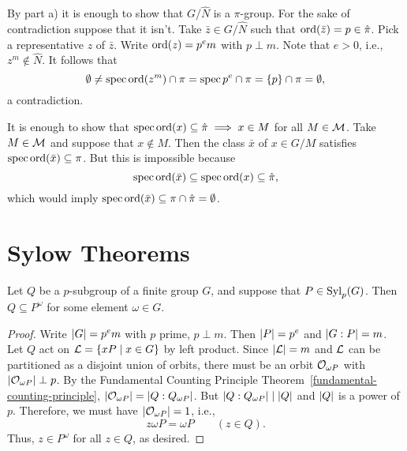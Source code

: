 \begin{solution}
\begin{enumerate}[\rm a)]
    \begin{description}[leftmargin=!,labelwidth=\widthof{$\hat N$:}]
    \item[$\hat N\supseteq N$:]
        By part a) it is enough to show that $G/\hat N$ is a $\pi$-group. For the sake of contradiction suppose that it isn't. Take $\bar z\in G/\hat N$ such that ${\rm ord}(\bar z)=p\in\hat\pi$. Pick a representative $z$ of $\bar z$. Write ${\rm ord}(z)=p^em$ with $p\perp m$. Note that $e>0$, i.e., $z^m\notin\hat N$. It follows that
        $$
            \emptyset\ne\operatorname{spec}{\rm ord}(z^m)\cap\pi=\operatorname{spec}p^e\cap\pi
                =\{p\}\cap\pi=\emptyset,
        $$
        a contradiction.
      \item[$\hat N\subseteq N$:] It is enough to show that $\operatorname{spec}{\rm ord}(x)\subseteq\hat\pi\implies x\in M$ for all $M\in\cal M$. Take $M\in\cal M$ and suppose that $x\notin M$. Then the class $\bar x$ of $x\in G/M$ satisfies $\operatorname{spec}{\rm ord}(\bar x)\subseteq\pi$. But this is impossible because
      $$
        \operatorname{spec}{\rm ord}(\bar x)\subseteq\operatorname{spec}{\rm ord}(x)\subseteq\hat\pi,
      $$
      which would imply $\operatorname{spec}{\rm ord}(\bar x)\subseteq\pi\cap\hat\pi=\emptyset$.
  \end{description}
\end{enumerate}
\end{solution}


\section{Sylow Theorems}

\begin{thm}\label{sylow-pre-d}
    Let $Q$ be a $p$-subgroup of a finite group $G$, and suppose that $P \in{\rm Syl}_p(G)$. Then $Q \subseteq P^\omega$ for some element $\omega\in G$.
\end{thm}

\begin{proof} Write $\left\vert{G}\right\vert=p^em$ with $p$ prime, $p\perp m$. Then $\left\vert{P}\right\vert=p^e$ and $\left\vert{G:P}\right\vert=m$. Let $Q$ act on ${\cal L}=\{xP\mid x\in G\}$ by left product. Since $\left\vert{\cal L}\right\vert=m$ and $\cal L$ can be partitioned as a disjoint union of orbits, there must be an orbit ${\cal O}_{\omega P}$ with $\left\vert{{\cal O}_{\omega P}}\right\vert\perp p$. By the Fundamental Counting Principle Theorem~\ref{fundamental-counting-principle}, $\left\vert{{\cal O}_{\omega P}}\right\vert=\left\vert{Q:Q_{\omega P}}\right\vert$. But $\left\vert{Q:Q_{\omega P}}\right\vert\mid\left\vert{Q}\right\vert$ and $\left\vert{Q}\right\vert$ is a power of $p$. Therefore, we must have $\left\vert{{\cal O}_{\omega P}}\right\vert=1$, i.e.,
$$
    z\omega P=\omega P\qquad(z\in Q).
$$
Thus, $z\in P^\omega$ for all $z\in Q$, as desired.  \end{proof}

